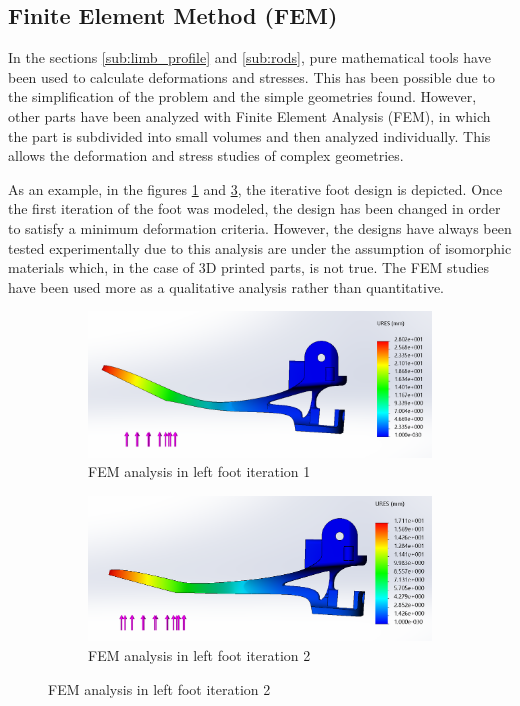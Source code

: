 
\subsection{Finite Element Method (FEM)} %
\label{sub:finite_element_method}
In the sections \ref{sub:limb_profile} and \ref{sub:rods}, pure mathematical tools have been used to calculate deformations and stresses.
This has been possible due to the simplification of the problem and the simple geometries found.
However, other parts have been analyzed with Finite Element Analysis (FEM), in which the part is subdivided into small volumes and then analyzed individually.
This allows the deformation and stress studies of complex geometries.

As an example, in the figures \ref{fig:fem_foot_iteration_1} and \ref{fig:fem_foot_iteration_2}, the iterative foot design is depicted.
Once the first iteration of the foot was modeled, the design has been changed in order to satisfy a minimum deformation criteria.
However, the designs have always been tested experimentally due to this analysis are under the assumption of isomorphic materials which, in the case of 3D printed parts, is not true.
The FEM studies have been used more as a qualitative analysis rather than quantitative.

\begin{figure}[ht]
    \centering
    \begin{subfigure}[b]{0.49\textwidth}
        \includegraphics[width=\textwidth]{figures/fem_5N_1.PNG}
        \caption{FEM analysis in left foot iteration 1}
        \label{fig:fem_foot_iteration_1}
    \end{subfigure}
    \begin{subfigure}[b]{0.49\textwidth}
        \includegraphics[width=\textwidth]{figures/fem_5N_2.PNG}
        \caption{FEM analysis in left foot iteration 2}
        \label{fig:fem_foot_iteration_2}
    \end{subfigure}
\end{figure}


